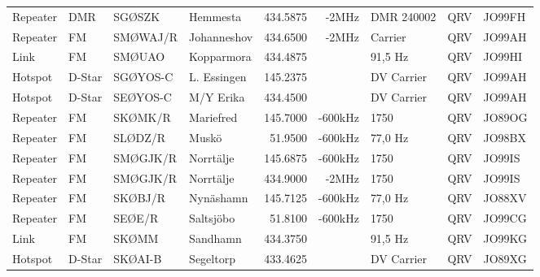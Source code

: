 \begin{landscape}
\begin{longtable}{llllrrlcl}
	Repeater          & DMR          & SGØSZK        & Hemmesta     & 434.5875          & -2MHz          & DMR 240002      & QRV             & JO99FH           \\
	Repeater          & FM           & SMØWAJ/R      & Johanneshov  & 434.6500          & -2MHz          & Carrier         & QRV             & JO99AH           \\
	Link              & FM           & SMØUAO        & Kopparmora   & 434.4875          &                & 91,5 Hz         & QRV             & JO99HI           \\
	Hotspot           & D-Star       & SGØYOS-C      & L. Essingen  & 145.2375          &                & DV Carrier      & QRV             & JO99AH           \\
	Hotspot           & D-Star       & SEØYOS-C      & M/Y Erika    & 434.4500          &                & DV Carrier      & QRV             & JO99AH           \\
	Repeater          & FM           & SKØMK/R       & Mariefred    & 145.7000          & -600kHz        & 1750            & QRV             & JO89OG           \\
	Repeater          & FM           & SLØDZ/R       & Muskö        & 51.9500           & -600kHz        & 77,0 Hz         & QRV             & JO98BX           \\
	Repeater          & FM           & SMØGJK/R      & Norrtälje    & 145.6875          & -600kHz        & 1750            & QRV             & JO99IS           \\
	Repeater          & FM           & SMØGJK/R      & Norrtälje    & 434.9000          & -2MHz          & 1750            & QRV             & JO99IS           \\
	Repeater          & FM           & SKØBJ/R       & Nynäshamn    & 145.7125          & -600kHz        & 77,0 Hz         & QRV             & JO88XV           \\
	Repeater          & FM           & SEØE/R        & Saltsjöbo    & 51.8100           & -600kHz        & 1750            & QRV             & JO99CG           \\
	Link              & FM           & SKØMM         & Sandhamn     & 434.3750          &                & 91,5 Hz         & QRV             & JO99KG           \\
	Hotspot           & D-Star       & SKØAI-B       & Segeltorp    & 433.4625          &                & DV Carrier      & QRV             & JO89XG           \\

\end{longtable}
\end{landscape}
